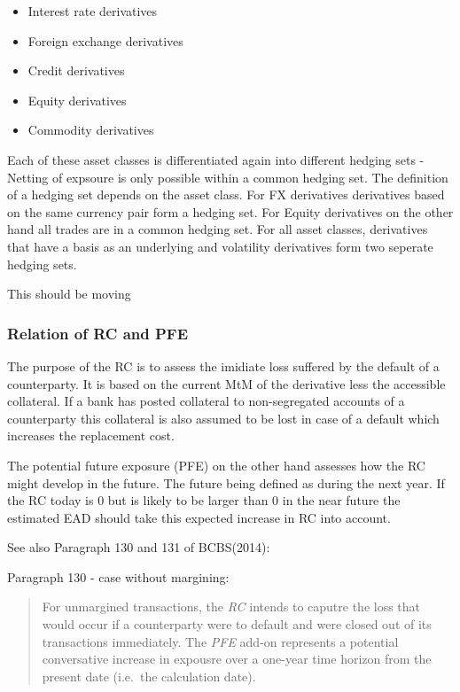 \documentclass[11pt]{article}
\providecommand{\tightlist}{%
      \setlength{\itemsep}{0pt}\setlength{\parskip}{0pt}}
\begin{document}
\begin{itemize}
\tightlist
\item
  Interest rate derivatives
\item
  Foreign exchange derivatives
\item
  Credit derivatives
\item
  Equity derivatives
\item
  Commodity derivatives
\end{itemize}

Each of these asset classes is differentiated again into different
hedging sets - Netting of expsoure is only possible within a common
hedging set. The definition of a hedging set depends on the asset class.
For FX derivatives derivatives based on the same currency pair form a
hedging set. For Equity derivatives on the other hand all trades are in
a common hedging set. For all asset classes, derivatives that have a
basis as an underlying and volatility derivatives form two seperate
hedging sets.

This should be moving

    \hypertarget{relation-of-rc-and-pfe}{%
\subsubsection{Relation of RC and PFE}\label{relation-of-rc-and-pfe}}

The purpose of the RC is to assess the imidiate loss suffered by the
default of a counterparty. It is based on the current MtM of the
derivative less the accessible collateral. If a bank has posted
collateral to non-segregated accounts of a counterparty this collateral
is also assumed to be lost in case of a default which increases the
replacement cost.

The potential future exposure (PFE) on the other hand assesses how the
RC might develop in the future. The future being defined as during the
next year. If the RC today is 0 but is likely to be larger than 0 in the
near future the estimated EAD should take this expected increase in RC
into account.

See also Paragraph 130 and 131 of BCBS(2014):

Paragraph 130 - case without margining:

\begin{quote}
For unmargined transactions, the \emph{RC} intends to caputre the loss
that would occur if a counterparty were to default and were closed out
of its transactions immediately. The \emph{PFE} add-on represents a
potential conversative increase in expousre over a one-year time horizon
from the present date (i.e.~the calculation date).
\end{quote}
\end{document}

